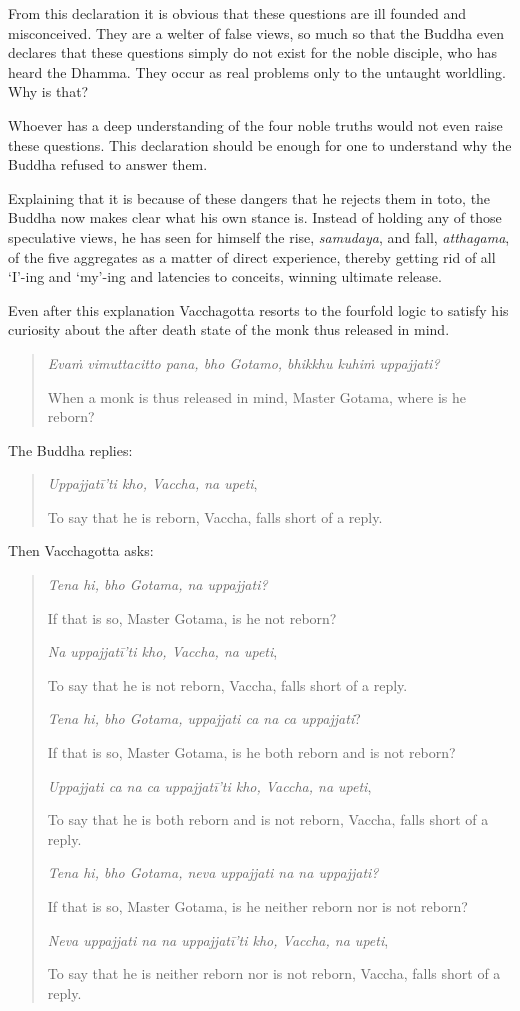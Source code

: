 From this declaration it is obvious that these questions are ill founded and misconceived. They are a welter of false views, so much so that the Buddha even declares that these questions simply do not exist for the noble disciple, who has heard the Dhamma. They occur as real problems only to the untaught worldling. Why is that?

Whoever has a deep understanding of the four noble truths would not even raise these questions. This declaration should be enough for one to understand why the Buddha refused to answer them.

Explaining that it is because of these dangers that he rejects them in toto, the Buddha now makes clear what his own stance is. Instead of holding any of those speculative views, he has seen for himself the rise, \emph{samudaya}, and fall, \emph{atthagama}, of the five aggregates as a matter of direct experience, thereby getting rid of all `I'-ing and `my'-ing and latencies to conceits, winning ultimate release.

Even after this explanation Vacchagotta resorts to the fourfold logic to satisfy his curiosity about the after death state of the monk thus released in mind.

\begin{quote}
\emph{Evaṁ vimuttacitto pana, bho Gotamo, bhikkhu kuhiṁ uppajjati?}

When a monk is thus released in mind, Master Gotama, where is he reborn?
\end{quote}

The Buddha replies:

\begin{quote}
\emph{Uppajjatī'ti kho, Vaccha, na upeti},

To say that he is reborn, Vaccha, falls short of a reply.
\end{quote}

Then Vacchagotta asks:

\begin{quote}
\emph{Tena hi, bho Gotama, na uppajjati?}

If that is so, Master Gotama, is he not reborn?

\emph{Na uppajjatī'ti kho, Vaccha, na upeti},

To say that he is not reborn, Vaccha, falls short of a reply.

\emph{Tena hi, bho Gotama, uppajjati ca na ca uppajjati}?

If that is so, Master Gotama, is he both reborn and is not reborn?

\emph{Uppajjati ca na ca uppajjatī'ti kho, Vaccha, na upeti},

To say that he is both reborn and is not reborn, Vaccha, falls short of a reply.

\emph{Tena hi, bho Gotama, neva uppajjati na na uppajjati?}

If that is so, Master Gotama, is he neither reborn nor is not reborn?

\emph{Neva uppajjati na na uppajjatī'ti kho, Vaccha, na upeti},

To say that he is neither reborn nor is not reborn, Vaccha, falls short of a reply.
\end{quote}

